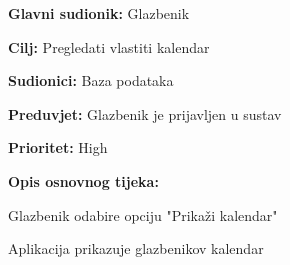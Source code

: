 \noindent {}
	\begin{packed_item}
		
		\item \textbf{Glavni sudionik: } Glazbenik
		\item \textbf{Cilj:} Pregledati vlastiti kalendar
		\item \textbf{Sudionici:} Baza podataka
		\item \textbf{Preduvjet:} Glazbenik je prijavljen u sustav
		\item \textbf{Prioritet:} High
		\item \textbf{Opis osnovnog tijeka:} 
		
		\item[] \begin{packed_enum}
			
			\item Glazbenik odabire opciju "Prikaži kalendar"
			\item Aplikacija prikazuje glazbenikov kalendar
		\end{packed_enum}  
	\end{packed_item}
	
